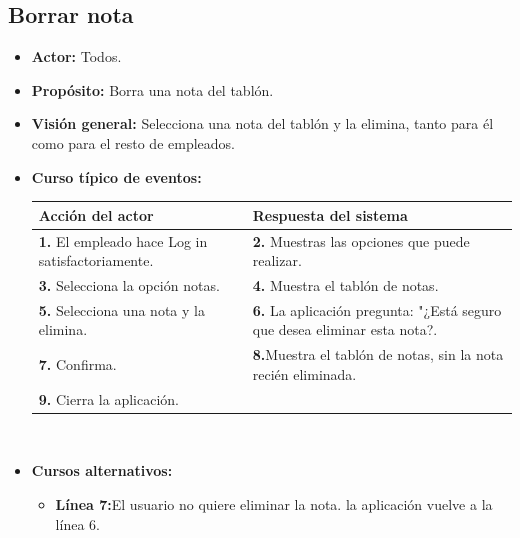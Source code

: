 \documentclass[spanish,a4paper,12pt]{report}	%
\begin{document}
		\subsection{Borrar nota}
			\begin{itemize}
			\item \textbf{Actor:} Todos.
			\item \textbf{Propósito: } Borra una nota del tablón.
			\item \textbf{Visión general:} Selecciona una nota del tablón y la elimina, tanto para él como para el resto de empleados.
			\item \textbf{Curso típico de eventos:} 	\\
				\begin{tabular}{|p{6cm}||p{6cm}|}
				\hline
				\textbf{Acción del actor} & \textbf{Respuesta del sistema} \\ \hline \hline
				\textbf{1.}    El empleado hace Log in satisfactoriamente. & \textbf{2.} Muestras las opciones que puede realizar. \\ \hline
				\textbf{3.} Selecciona la opción notas. & \textbf{4.} Muestra el tablón de notas. \\ \hline
				\textbf{5.} Selecciona una nota y la elimina.	& \textbf{6.} La aplicación pregunta: "¿Está seguro que desea eliminar esta nota?. \\ \hline
				\textbf{7.} Confirma.	& \textbf{8.}Muestra el tablón de notas, sin la nota recién eliminada. \\ \hline
				\textbf{9.} Cierra la aplicación. &  \\ \hline
			\end{tabular}
			\\
			\item \textbf{Cursos alternativos:} 
			\begin{itemize}
			\item  \textbf{Línea 7:}El usuario no quiere eliminar la nota. la aplicación vuelve a la línea 6.
			\end {itemize}
		\end {itemize}

	
	\hspace{-2 true cm}
\end{document}
